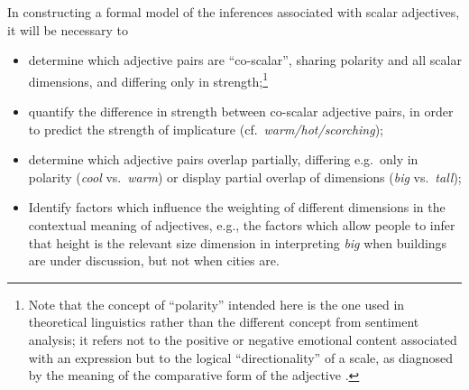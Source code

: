 \documentclass[10pt]{article}
\begin{document}

In constructing a formal model of the inferences associated with scalar adjectives, it will be necessary to 
 \vspace{-.25in}
\begin{itemize}
\item [1.] determine which adjective pairs are ``co-scalar'', sharing polarity and all scalar dimensions, and differing only in strength;\footnote{\label{polarity}Note that the concept of ``polarity'' intended here is the one used in theoretical linguistics rather than the different concept from sentiment analysis; it refers not to the positive or negative emotional content associated with an expression \cite{wilson2009recognizing} but to the logical ``directionality'' of a scale, as diagnosed by the meaning of the comparative form of the adjective \cite{kennedy2001polar}.}
\item [2.]quantify the difference in strength between co-scalar adjective pairs, in order to predict the strength of implicature (cf.\ \emph{warm/hot/scorching});
\item [3.]determine which adjective pairs overlap partially, differing e.g.\ only in polarity (\emph{cool} vs.\ \emph{warm}) or display partial overlap of dimensions (\emph{big} vs.\ \emph{tall});
\item [4.] Identify factors which influence the weighting of different dimensions in the contextual meaning of adjectives, e.g., the factors which allow people to infer that height is the relevant size dimension in interpreting \emph{big} when buildings are under discussion, but not when cities are.
\end{itemize}
 \vspace{-.05in}
\end{document}
